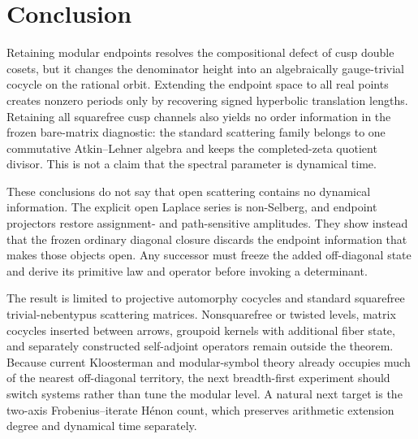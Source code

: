 \section{Conclusion}

Retaining modular endpoints resolves the compositional defect of cusp double
cosets, but it changes the denominator height into an algebraically
gauge-trivial cocycle on the rational orbit.  Extending the endpoint space to
all real points creates nonzero periods only by recovering signed hyperbolic
translation lengths.  Retaining
all squarefree cusp channels also yields no order information in the frozen
bare-matrix diagnostic: the standard scattering family belongs to one
commutative Atkin--Lehner algebra and keeps the completed-zeta quotient
divisor.  This is not a claim that the spectral parameter is dynamical time.

These conclusions do not say that open scattering contains no dynamical
information.  The explicit open Laplace series is non-Selberg, and endpoint
projectors restore assignment- and path-sensitive amplitudes.  They show
instead that the frozen ordinary diagonal closure discards the endpoint
information that makes those objects open.  Any successor must freeze the
added off-diagonal state and
derive its primitive law and operator before invoking a determinant.

The result is limited to projective automorphy cocycles and standard
squarefree trivial-nebentypus scattering matrices.  Nonsquarefree or twisted
levels, matrix cocycles inserted between arrows, groupoid kernels with
additional fiber state, and separately constructed self-adjoint operators
remain outside the theorem.  Because current Kloosterman and modular-symbol
theory already occupies much of the nearest off-diagonal territory, the next
breadth-first experiment should switch systems rather than tune the modular
level.  A natural next target is the two-axis Frobenius--iterate H\'enon count,
which preserves arithmetic extension degree and dynamical time separately.
